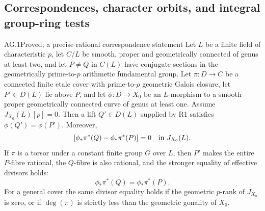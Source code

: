 \subsection{Correspondences, character orbits, and integral group-ring tests}

\begin{claim}{AG.1}{Proved; a precise rational correspondence statement}
Let $L$ be a finite field of characteristic $p$, let $C/L$ be smooth,
proper and geometrically connected of genus at least two, and let
$P\ne Q$ in $C(L)$ have conjugate sections in the geometrically
prime-to-$p$ arithmetic fundamental group. Let
$\pi:D\to C$ be a connected finite etale cover with prime-to-$p$ geometric
Galois closure, let $P'\in D(L)$ lie above $P$, and let
$\phi:D\to X_0$ be an $L$-morphism to a smooth proper geometrically
connected curve of genus at least one. Assume
$J_{X_0}(L)[p]=0$. Then a lift $Q'\in D(L)$ supplied by R1 satisfies
$\phi(Q')=\phi(P')$. Moreover,
\[
 [\phi_*\pi^*(Q)-\phi_*\pi^*(P)]=0\quad\hbox{in }J_{X_0}(L).
\]
If $\pi$ is a torsor under a constant finite group $G$ over $L$,
then $P'$ makes the entire $P$-fibre rational, the $Q$-fibre is also
rational, and the stronger equality of effective divisors holds:
\[
             \phi_*\pi^*(Q)=\phi_*\pi^*(P).
\]
For a general cover the same divisor equality holds if the geometric
$p$-rank of $J_{X_0}$ is zero, or if $\deg(\pi)$ is strictly less
than the geometric gonality of $X_0$.
\end{claim}

